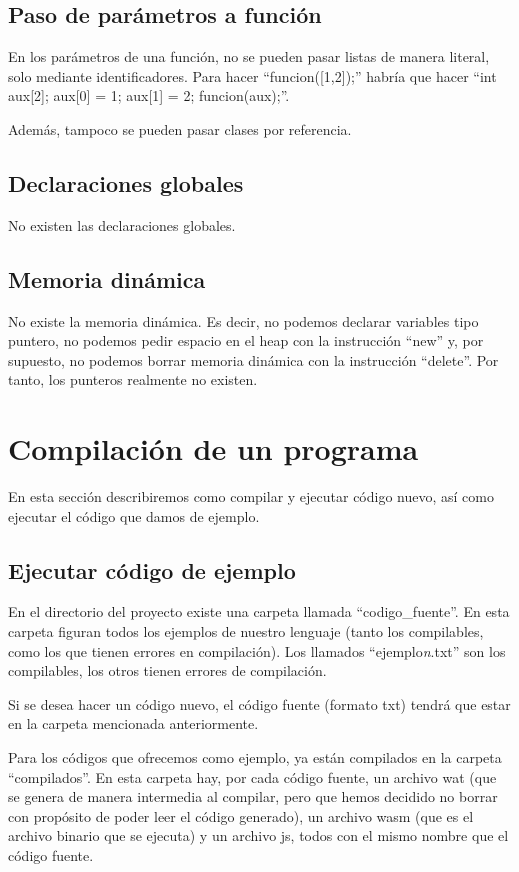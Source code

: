 \documentclass{article}
\begin{document}
\subsection{Paso de parámetros a función}
En los parámetros de una función, no se pueden pasar listas de manera literal, solo mediante identificadores. Para hacer ``funcion([1,2]);'' habría que hacer ``int aux[2]; aux[0] = 1; aux[1] = 2; funcion(aux);''.

Además, tampoco se pueden pasar clases por referencia.

\subsection{Declaraciones globales}
No existen las declaraciones globales.

\subsection{Memoria dinámica}
No existe la memoria dinámica. Es decir, no podemos declarar variables tipo puntero, no podemos pedir espacio en el heap con la instrucción ``new'' y, por supuesto, no podemos borrar memoria dinámica con la instrucción ``delete''. Por tanto, los punteros realmente no existen.

\section{Compilación de un programa}
En esta sección describiremos como compilar y ejecutar código nuevo, así como ejecutar el código que damos de ejemplo.

\subsection{Ejecutar código de ejemplo}
En el directorio del proyecto existe una carpeta llamada ``codigo\_fuente''. En esta carpeta figuran todos los ejemplos de nuestro lenguaje (tanto los compilables, como los que tienen errores en compilación). Los llamados ``ejemplo\textit{n}.txt'' son los compilables, los otros tienen errores de compilación.

Si se desea hacer un código nuevo, el código fuente (formato txt) tendrá que estar en la carpeta mencionada anteriormente.

Para los códigos que ofrecemos como ejemplo, ya están compilados en la carpeta ``compilados''. En esta carpeta hay, por cada código fuente, un archivo wat (que se genera de manera intermedia al compilar, pero que hemos decidido no borrar con propósito de poder leer el código generado), un archivo wasm (que es el archivo binario que se ejecuta) y un archivo js, todos con el mismo nombre que el código fuente.
\end{document}
